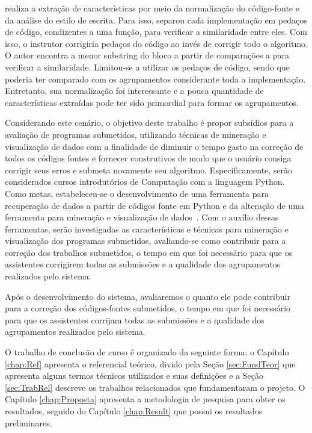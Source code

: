 	 realiza a extração de características por meio da normalização
	do código-fonte e da análise do estilo de escrita. Para isso, separou cada implementação
	em pedaços de código, condizentes a uma função, para verificar a similaridade entre eles.
	Com isso, o instrutor corrigiria pedaços do código ao invés de corrigir todo o algoritmo.
	O autor encontra a menor substring do bloco a partir de comparações  a
	 para verificar a similaridade. Limitou-se a utilizar os pedaços de
	código, sendo que poderia ter comparado com os agrupamentos considerante toda a
	implementação. Entretanto, sua normalização foi interessante e a pouca quantidade de
	características extraídas pode ter sido primordial para formar os agrupamentos.
	
	
	Considerando este cenário, o objetivo deste trabalho é propor subsídios para a
	avaliação de programas submetidos, utilizando técnicas de mineração e visualização
	de dados com a finalidade de diminuir o tempo gasto na correção de todos os códigos
	fontes e  fornecer  construtivos de modo que o usuário consiga
	corrigir seus erros e submeta novamente seu algoritmo. Especificamente, serão
	considerados cursos introdutórios de Computação com a linguagem Python. Como
	metas, estabeleceu-se o desenvolvimento de uma ferramenta para recuperação de
	dados a partir de códigos fonte em Python e da alteração de uma ferramenta para
	mineração e visualização de dados~\cite{Alencar}. Com o auxílio dessas ferramentas,
	serão investigadas as características e técnicas para mineração e visualização
	dos programas submetidos, avaliando-se como contribuir para
	a correção dos trabalhos submetidos, o tempo em que foi necessário para
	que os assistentes corrigirem todas as submissões e a qualidade dos agrupamentos
	realizados pelo sistema.
	
	Após o desenvolvimento do sistema, avaliaremos o quanto ele pode contribuir para
	a correção dos códigos-fontes submetidos, o tempo em que foi necessário para que
	os assistentes corrijam todas as submissões e a qualidade dos agrupamentos
	realizados pelo sistema.
	
	O trabalho de conclusão de curso é organizado da seguinte forma: o Capítulo
	\ref{chap:Ref} apresenta o referencial teórico, divido pela Seção \ref{sec:FundTeor}
	que apresenta alguns termos técnicos utilizados e suas definições e a Seção
	\ref{sec:TrabRel} descreve os trabalhos relacionados que fundamentaram o projeto.
	O Capítulo \ref{chap:Proposta} apresenta a metodologia de pesquisa para obter os
	resultados, seguido do Capítulo \ref{chap:Result} que possui os resultados
	preliminares.